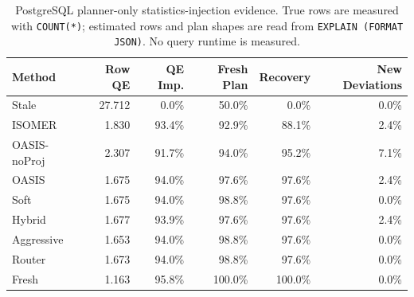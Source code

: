 \begin{table}[t]
  \centering
  \small
  \caption{PostgreSQL planner-only statistics-injection evidence. True rows are measured with \texttt{COUNT(*)}; estimated rows and plan shapes are read from \texttt{EXPLAIN (FORMAT JSON)}. No query runtime is measured.}
  \label{tab:postgres_planner_stats_injection}
  \setlength{\tabcolsep}{4pt}
  \begin{tabular}{lrrrrr}
    \toprule
    Method & Row QE & QE Imp. & Fresh Plan & Recovery & New Deviations \\
    \midrule
    Stale & 27.712 & 0.0\% & 50.0\% & 0.0\% & 0.0\% \\
    ISOMER & 1.830 & 93.4\% & 92.9\% & 88.1\% & 2.4\% \\
    OASIS-noProj & 2.307 & 91.7\% & 94.0\% & 95.2\% & 7.1\% \\
    OASIS & 1.675 & 94.0\% & 97.6\% & 97.6\% & 2.4\% \\
    Soft & 1.675 & 94.0\% & 98.8\% & 97.6\% & 0.0\% \\
    Hybrid & 1.677 & 93.9\% & 97.6\% & 97.6\% & 2.4\% \\
    Aggressive & 1.653 & 94.0\% & 98.8\% & 97.6\% & 0.0\% \\
    Router & 1.673 & 94.0\% & 98.8\% & 97.6\% & 0.0\% \\
    Fresh & 1.163 & 95.8\% & 100.0\% & 100.0\% & 0.0\% \\
    \bottomrule
  \end{tabular}
\end{table}
